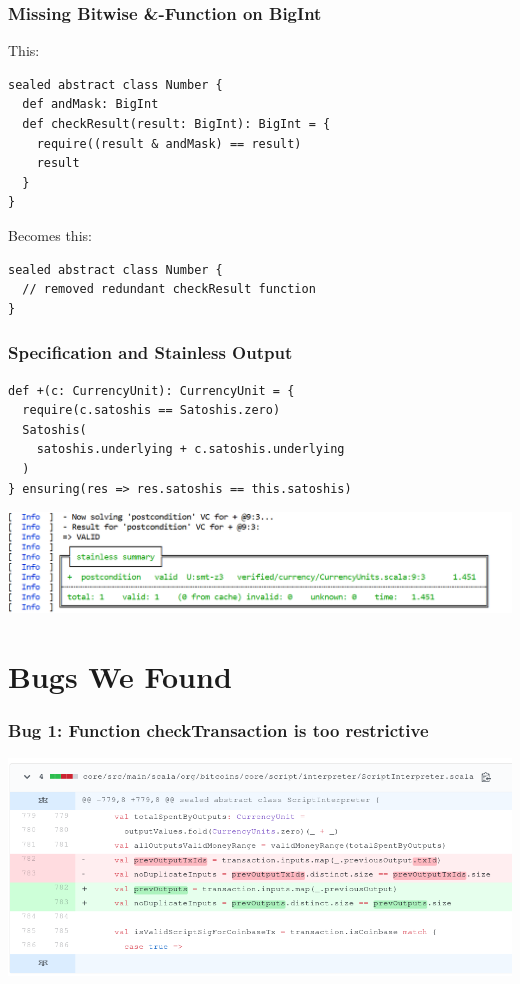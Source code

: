 \documentclass{beamer}
\begin{document}
\begin{frame}[fragile]
\frametitle{Missing Bitwise \&-Function on BigInt}
This:
\begin{lstlisting}[style=scala]
sealed abstract class Number {
  def andMask: BigInt
  def checkResult(result: BigInt): BigInt = {
    require((result & andMask) == result)
    result
  }
}  
\end{lstlisting}
Becomes this:
\begin{lstlisting}[style=scala]
sealed abstract class Number {
  // removed redundant checkResult function
}
\end{lstlisting}
\end{frame}


\begin{frame}[fragile]
\frametitle{Specification and Stainless Output}
\begin{lstlisting}[style=scala]
def +(c: CurrencyUnit): CurrencyUnit = {
  require(c.satoshis == Satoshis.zero)
  Satoshis(
    satoshis.underlying + c.satoshis.underlying
  )
} ensuring(res => res.satoshis == this.satoshis)
\end{lstlisting}

\bigskip\bigskip

\includegraphics[width=\textwidth]{result_output}
\end{frame}



\section{Bugs We Found}


\begin{frame}
\frametitle{Bug 1: Function checkTransaction is too restrictive}
\includegraphics[width=\textwidth]{bug1.png}
\end{frame}
\end{document}
